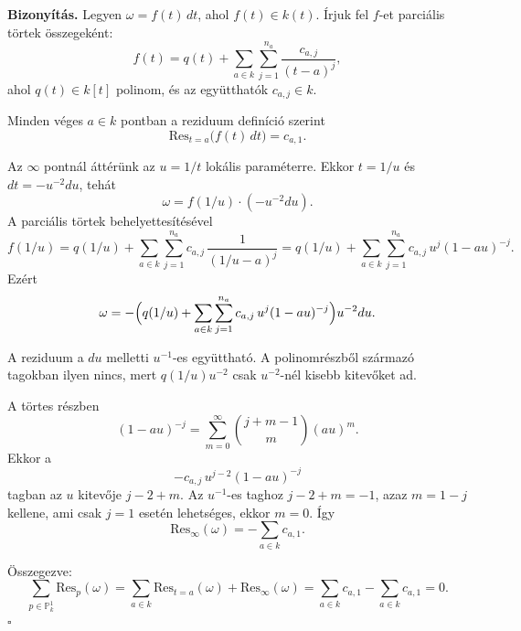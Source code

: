 \documentclass[a4paper,12pt]{article}
\theoremstyle{definition}
\newenvironment{biz}{\par\noindent\textbf{Bizonyítás.}\enspace\ignorespaces}
{\hfill$\square$\par}
\theoremstyle{plain}
\theoremstyle{remark}
\newcommand{\Res}{\mathrm{Res}}
\begin{document}
\begin{biz}
Legyen $\omega=f(t)\,dt$, ahol $f(t)\in k(t)$. Írjuk fel $f$-et parciális törtek összegeként:
\[
f(t)=q(t)+\sum_{a\in k}\sum_{j=1}^{n_a}\frac{c_{a,j}}{(t-a)^j},
\]
ahol $q(t)\in k[t]$ polinom, és az együtthatók $c_{a,j}\in k$.

Minden véges $a\in k$ pontban a reziduum definíció szerint
\[
\Res_{t=a}\bigl(f(t)\,dt\bigr)=c_{a,1}.
\]

Az $\infty$ pontnál áttérünk az $u=1/t$ lokális paraméterre. Ekkor $t=1/u$ és $dt=-u^{-2}du$, tehát
\[
\omega=f(1/u)\cdot(-u^{-2}du).
\]
A parciális törtek behelyettesítésével
\[
f(1/u)=q(1/u)+\sum_{a\in k}\sum_{j=1}^{n_a}c_{a,j}\,\frac{1}{(1/u-a)^j}
      =q(1/u)+\sum_{a\in k}\sum_{j=1}^{n_a} c_{a,j}\,u^j(1-au)^{-j}.
\]
Ezért
\[
\omega
=
-\Bigl(q(1/u)+\sum_{a\in k}\sum_{j=1}^{n_a} c_{a,j}\,u^j(1-au)^{-j}\Bigr)u^{-2}du.
\]

A reziduum a $du$ melletti $u^{-1}$-es együttható. A polinomrészből származó tagokban ilyen nincs, mert $q(1/u)u^{-2}$ csak $u^{-2}$-nél kisebb kitevőket ad.

A törtes részben
\[
(1-au)^{-j}=\sum_{m=0}^{\infty}\binom{j+m-1}{m}(au)^m.
\]
Ekkor a
\[
-c_{a,j}\,u^{j-2}(1-au)^{-j}
\]
tagban az $u$ kitevője $j-2+m$. Az $u^{-1}$-es taghoz $j-2+m=-1$, azaz $m=1-j$ kellene, ami csak $j=1$ esetén lehetséges, ekkor $m=0$. Így
\[
\Res_\infty(\omega)=-\sum_{a\in k}c_{a,1}.
\]

Összegezve:
\[
\sum_{p\in\mathbb{P}^1_k}\Res_p(\omega)
=
\sum_{a\in k}\Res_{t=a}(\omega)+\Res_\infty(\omega)
=
\sum_{a\in k}c_{a,1}-\sum_{a\in k}c_{a,1}
=0.
\]
\end{biz}
\end{document}
